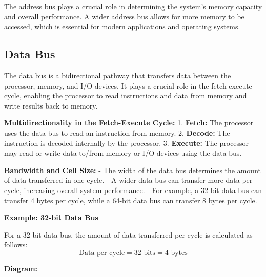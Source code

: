 \documentclass{report}
\begin{document}
The address bus plays a crucial role in determining the system's memory capacity and overall performance. A wider address bus allows for more memory to be accessed, which is essential for modern applications and operating systems.

\subsection{Data Bus}

The data bus is a bidirectional pathway that transfers data between the processor, memory, and I/O devices. It plays a crucial role in the fetch-execute cycle, enabling the processor to read instructions and data from memory and write results back to memory.

\textbf{Multidirectionality in the Fetch-Execute Cycle:}
1. \textbf{Fetch:} The processor uses the data bus to read an instruction from memory.
2. \textbf{Decode:} The instruction is decoded internally by the processor.
3. \textbf{Execute:} The processor may read or write data to/from memory or I/O devices using the data bus.

\textbf{Bandwidth and Cell Size:}
- The width of the data bus determines the amount of data transferred in one cycle.
- A wider data bus can transfer more data per cycle, increasing overall system performance.
- For example, a 32-bit data bus can transfer 4 bytes per cycle, while a 64-bit data bus can transfer 8 bytes per cycle.

\textbf{Example: 32-bit Data Bus}

For a 32-bit data bus, the amount of data transferred per cycle is calculated as follows:
\[
	\text{Data per cycle} = 32 \text{ bits} = 4 \text{ bytes}
\]

\textbf{Diagram:}

\begin{center}
\end{center}
\end{document}
